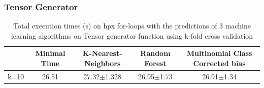 \subsubsection{Tensor Generator}
\begin{table}[h]
	\centering
	\caption{Total execution times (s) on hpx for-loops with the predictions of 3 machine learning algorithms on Tensor generator function using k-fold cross validation}
	\label{my-label}
	\begin{tabular}{|c|c|c|c|c|}
		\hline
		& Minimal Time&K-Nearest-Neighbors & Random Forest &Multinomial Class Corrected bias\\ \hline
		k=10  &26.51&
		27.32$\pm$1.328      & 26.95$\pm$1.73&26.91$\pm$1.34 \\ \hline
	\end{tabular}
\end{table}

